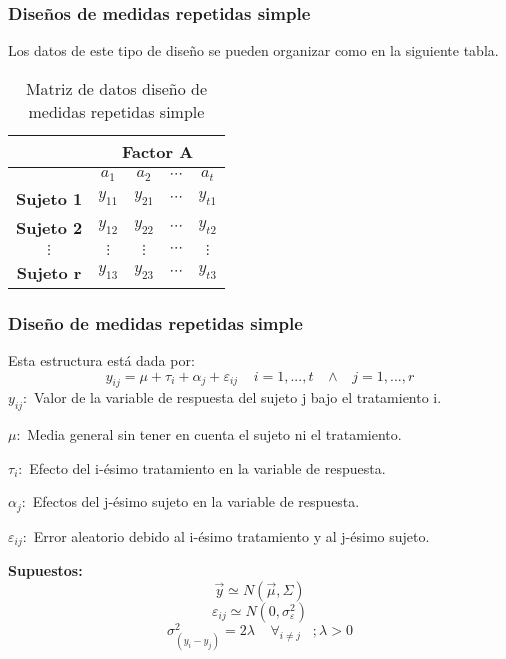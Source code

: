 \documentclass[12pt]{beamer}
\begin{document}
\begin{frame}
\frametitle{Diseños de medidas repetidas simple}
Los datos de este tipo de diseño se pueden organizar como en la siguiente tabla.
\begin{table}[htbp]
  \centering
    \begin{tabular}{|c|c|c|c|c|}
\cline{2-5}    \multicolumn{1}{r|}{} & \multicolumn{4}{c|}{\textbf{Factor A}} \\
    \hline
          & \textbf{$a_1$} & \textbf{$a_2$} & $\cdots$ & \textbf{$a_t$} \\
    \hline
    \textbf{Sujeto 1} & $y_{11}$ & $y_{21}$ & $\cdots$ & $y_{t1}$ \\
    
    \textbf{Sujeto 2} & $y_{12}$ & $y_{22}$ & $\cdots$ & $y_{t2}$ \\
    
    $\vdots$ & $\vdots$ & $\vdots$ & $\cdots$ & $\vdots$ \\
    
    \textbf{Sujeto r} & $y_{13}$ & $y_{23}$ & $\cdots$ & $y_{t3}$ \\
    \hline
    \end{tabular}%
\caption{Matriz de datos diseño de medidas repetidas simple}  
  \label{tab:addlabel}%
\end{table}%

\end{frame}

\begin{frame}
\frametitle{Diseño de medidas repetidas simple}
Esta estructura está dada por:
$$y_{ij}=\mu+\tau_i+\alpha_j+\varepsilon_{ij} \;\;\;\; i=1,...,t \;\;\;  \wedge \;\;\; j=1,...,r$$
$y_{ij}:$ Valor de la variable de respuesta del sujeto j bajo el tratamiento i.

$\mu:$ Media general sin tener en cuenta el sujeto ni el tratamiento.

$\tau_i:$ Efecto del i-ésimo tratamiento en la variable de respuesta.

$\alpha_j:$ Efectos del j-ésimo sujeto en la variable de respuesta.

$\varepsilon_{ij}:$ Error aleatorio debido al i-ésimo tratamiento y al j-ésimo sujeto.

\textbf{Supuestos:} 
$$\vec{y} \simeq N(\vec{\mu},\Sigma)$$
$$\varepsilon_{ij} \simeq N(0,\sigma^2_\varepsilon)$$
$$\sigma^2_{(y_i-y_j)}=2\lambda  \;\;\;\; \forall_{i\neq j} \;\;\; ; \lambda>0$$ 

\end{frame}
\end{document}
